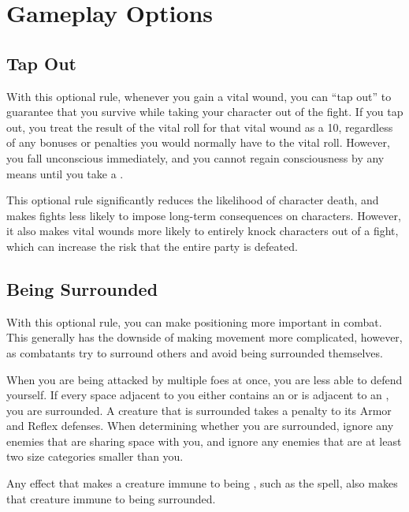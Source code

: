 \section{Gameplay Options}
    \subsection{Tap Out}
        With this optional rule, whenever you gain a vital wound, you can ``tap out'' to guarantee that you survive while taking your character out of the fight.
        If you tap out, you treat the result of the vital roll for that vital wound as a 10, regardless of any bonuses or penalties you would normally have to the vital roll.
        However, you fall unconscious immediately, and you cannot regain consciousness by any means until you take a .

        This optional rule significantly reduces the likelihood of character death, and makes fights less likely to impose long-term consequences on characters.
        However, it also makes vital wounds more likely to entirely knock characters out of a fight, which can increase the risk that the entire party is defeated.


    \subsection{Being Surrounded}\label{Being Surrounded}
        With this optional rule, you can make positioning more important in combat.
        This generally has the downside of making movement more complicated, however, as combatants try to surround others and avoid being surrounded themselves.

        When you are being attacked by multiple foes at once, you are less able to defend yourself.
        If every space adjacent to you either contains an  or is adjacent to an , you are surrounded.
        A creature that is surrounded takes a  penalty to its Armor and Reflex defenses.
        When determining whether you are surrounded, ignore any enemies that are sharing space with you, and ignore any enemies that are at least two size categories smaller than you.

        Any effect that makes a creature immune to being \partiallyunaware, such as the  spell, also makes that creature immune to being surrounded.

